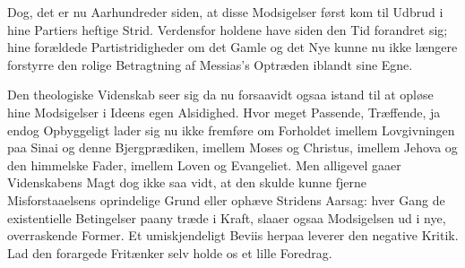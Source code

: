 \documentclass[12pt,a4paper]{book}
\begin{document}
Dog, det er nu Aarhundreder siden, at disse Modsigelser først kom til Udbrud i hine
Partiers heftige Strid. Verdensfor\-%
holdene have siden den Tid forandret sig; hine forældede Partistridigheder om det Gamle
og det Nye kunne nu ikke længere forstyrre den rolige Betragtning af Messias's Optræden
iblandt sine Egne.

Den theologiske Videnskab seer sig da nu forsaavidt ogsaa istand til at opløse hine
Modsigelser i Ideens egen Alsidighed. Hvor meget Passende, Træffende, ja endog
Opbyggeligt lader sig nu ikke fremføre om Forholdet imellem Lovgivningen paa Sinai og
denne Bjergprædiken, imellem Moses og Christus, imellem Jehova og den himmelske Fader,
imellem Loven og Evangeliet. Men alligevel gaaer Videnskabens Magt dog ikke saa vidt,
at den skulde kunne fjerne Misforstaaelsens oprindelige Grund eller ophæve Stridens
Aarsag: hver Gang de existentielle Betingelser paany træde i Kraft, slaaer ogsaa
Modsigelsen ud i nye, overraskende Former. Et umiskjendeligt Beviis herpaa leverer den
negative Kritik. Lad den forargede Fritænker selv holde os et lille Foredrag.
\end{document}

